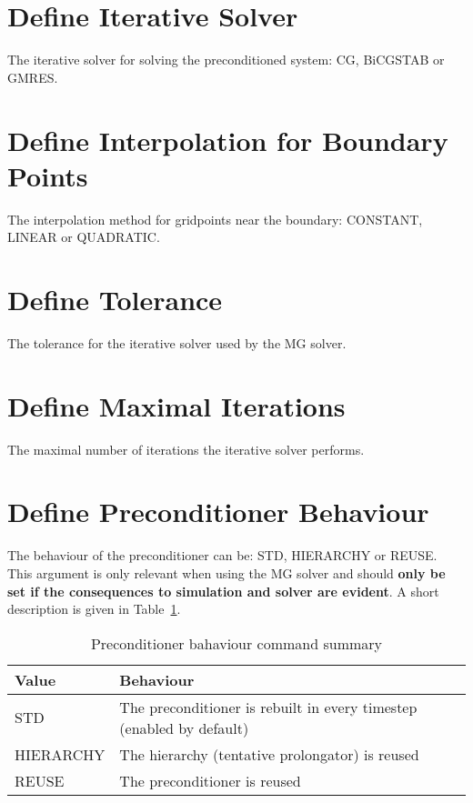 \section{Define Iterative Solver}
\label{sec:ITSOLVER}
The iterative solver for solving the preconditioned system: CG, BiCGSTAB or GMRES.

\section{Define Interpolation for Boundary Points}
\label{sec:INTERPL}
The interpolation method for gridpoints near the boundary: CONSTANT, LINEAR or QUADRATIC.

\section{Define Tolerance}
\label{sec:TOL}
The tolerance for the iterative solver used by the MG solver.

\section{Define Maximal Iterations}
\label{sec:MAXITERS}
The maximal number of iterations the iterative solver performs.

\section{Define Preconditioner Behaviour}
\label{sec:PRECMODE}
The behaviour of the preconditioner can be: STD, HIERARCHY or REUSE. This argument is only relevant when using the MG solver and should \textbf{only be set if the consequences to simulation and solver are evident}. A short description is given in Table~\ref{tab:preconditioner_behaviour}.

\begin{table}[ht] \footnotesize
  \begin{center}
    \caption{Preconditioner bahaviour command summary}
    \label{tab:preconditioner_behaviour}
    \begin{tabular}{|l|p{}|}
      \hline
      Value & Behaviour \\
      \hline
       STD & The preconditioner is rebuilt in every timestep (enabled by default) \\
       HIERARCHY & The hierarchy (tentative prolongator) is reused \\
       REUSE & The preconditioner is reused \\
      \hline
    \end{tabular}
  \end{center}
\end{table}

